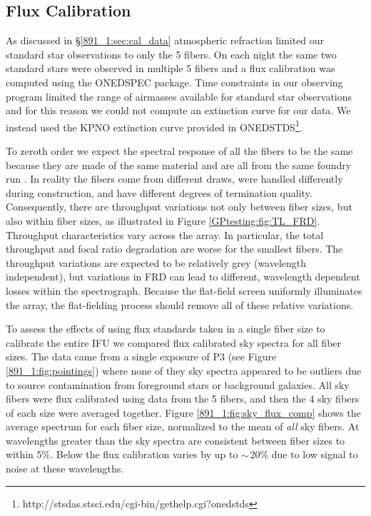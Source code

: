 \subsection{Flux Calibration}
\label{891_1:sec:flux_cal}


As discussed in \S\ref{891_1:sec:cal_data} atmospheric refraction limited
our standard star observations to only the 5 fibers. On each
night the same two standard stars were observed in multiple 5
fibers and a flux calibration was computed using the ONEDSPEC
package. Time constraints in our observing program limited the range
of airmasses available for standard star observations and for this
reason we could not compute an extinction curve for our data. We
instead used the KPNO extinction curve provided in
ONEDSTDS\footnote{http://stsdas.stsci.edu/cgi-bin/gethelp.cgi?onedstds}.

To zeroth order we expect the spectral response of all the \GP fibers
to be the same because they are made of the same material and are all
from the same foundry run \citep{Wood12}. In reality the \GP fibers
come from different draws, were handled differently during
construction, and have different degrees of termination quality.
Consequently, there are throughput variations not only between fiber
sizes, but also within fiber sizes, as illustrated in Figure
\ref{GPtesting:fig:TL_FRD}.  Throughput characteristics vary across
the \GP array. In particular, the total throughput and focal ratio
degradation are worse for the smallest fibers. The throughput
variations are expected to be relatively grey (wavelength
independent), but variations in FRD can lead to different, wavelength
dependent losses within the spectrograph. Because the flat-field
screen uniformly illuminates the array, the flat-fielding process
should remove all of these relative variations.

To assess the effects of using flux standards taken in a single fiber
size to calibrate the entire \GP IFU we compared flux calibrated sky
spectra for all fiber sizes. The data came from a single exposure of
P3 (see Figure \ref{891_1:fig:pointings}) where none of they sky spectra
appeared to be outliers due to source contamination from foreground
stars or background galaxies.  All sky fibers were flux calibrated
using data from the 5 fibers, and then the 4 sky fibers of each
size were averaged together. Figure \ref{891_1:fig:sky_flux_comp} shows the
average spectrum for each fiber size, normalized to the mean of
\emph{all} sky fibers. At wavelengths greater than  the
sky spectra are consistent between fiber sizes to within 5\%. Below
 the flux calibration varies by up to ${\sim}$20\% due
to low signal to noise at these wavelengths.

